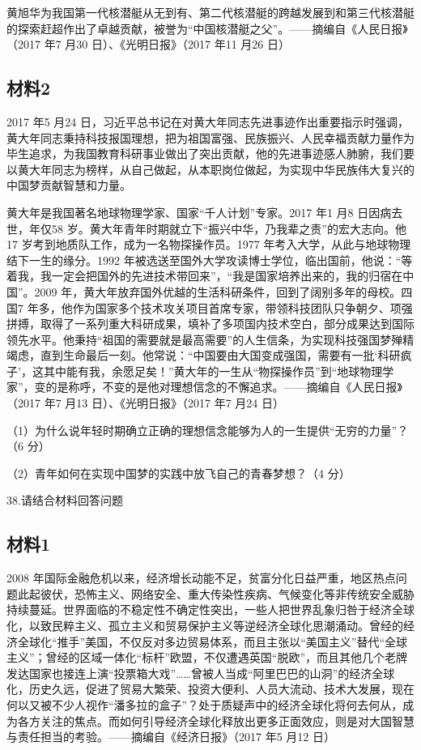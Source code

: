 \documentclass[UTF8,11pt]{ctexart}
\begin{document}
黄旭华为我国第一代核潜艇从无到有、第二代核潜艇的跨越发展到和第三代核潜艇的探索赶超作出了卓越贡献，被誉为“中国核潜艇之父”。——摘编自《人民日报》（2017 年7 月30 日）、《光明日报》（2017 年11 月26 日）

\subsection*{材料2}

2017 年5 月24 日，习近平总书记在对黄大年同志先进事迹作出重要指示时强调，黄大年同志秉持科技报国理想，把为祖国富强、民族振兴、人民幸福贡献力量作为毕生追求，为我国教育科研事业做出了突出贡献，他的先进事迹感人肺腑，我们要以黄大年同志为榜样，从自己做起，从本职岗位做起，为实现中华民族伟大复兴的中国梦贡献智慧和力量。

黄大年是我国著名地球物理学家、国家“千人计划”专家。2017 年1 月8 日因病去世，年仅58 岁。黄大年青年时期就立下“振兴中华，乃我辈之责”的宏大志向。他17 岁考到地质队工作，成为一名物探操作员。1977 年考入大学，从此与地球物理结下一生的缘分。1992 年被选送至国外大学攻读博士学位，临出国前，他说：“等着我，我一定会把国外的先进技术带回来”，“我是国家培养出来的，我的归宿在中国”。2009 年，黄大年放弃国外优越的生活科研条件，回到了阔别多年的母校。四国7 年多，他作为国家多个技术攻关项目首席专家，带领科技团队只争朝夕、项强拼搏，取得了一系列重大科研成果，填补了多项国内技术空白，部分成果达到国际领先水平。他秉持“祖国的需要就是最高需要”的人生信条，为实现科技强国梦殚精竭虑，直到生命最后一刻。他常说：“中国要由大国变成强国，需要有一批‘科研疯子’，这其中能有我，余愿足矣！”黄大年的一生从“物探操作员”到“地球物理学家”，变的是称呼，不变的是他对理想信念的不懈追求。——摘编自《人民日报》（2017 年7 月13 日）、《光明日报》（2017 年7 月24 日）

（1）为什么说年轻时期确立正确的理想信念能够为人的一生提供“无穷的力量”？（6 分）


（2）青年如何在实现中国梦的实践中放飞自己的青春梦想？（4 分）


38.请结合材料回答问题


\subsection*{材料1}

2008 年国际金融危机以来，经济增长动能不足，贫富分化日益严重，地区热点问题此起彼伏，恐怖主义、网络安全、重大传染性疾病、气候变化等非传统安全威胁持续蔓延。世界面临的不稳定性不确定性突出，一些人把世界乱象归咎于经济全球化，以致民粹主义、孤立主义和贸易保护主义等逆经济全球化思潮涌动。曾经的经济全球化“推手”美国，不仅反对多边贸易体系，而且主张以“美国主义”替代“全球主义”；曾经的区域一体化“标杆”欧盟，不仅遭遇英国“脱欧”，而且其他几个老牌发达国家也接连上演“投票箱大戏”……曾被人当成“阿里巴巴的山洞”的经济全球化，历史久远，促进了贸易大繁荣、投资大便利、人员大流动、技术大发展，现在何以又被不少人视作“潘多拉的盒子”？处于质疑声中的经济全球化将何去何从，成为各方关注的焦点。而如何引导经济全球化释放出更多正面效应，则是对大国智慧与责任担当的考验。——摘编自《经济日报》（2017 年5 月12 日）
\end{document}
